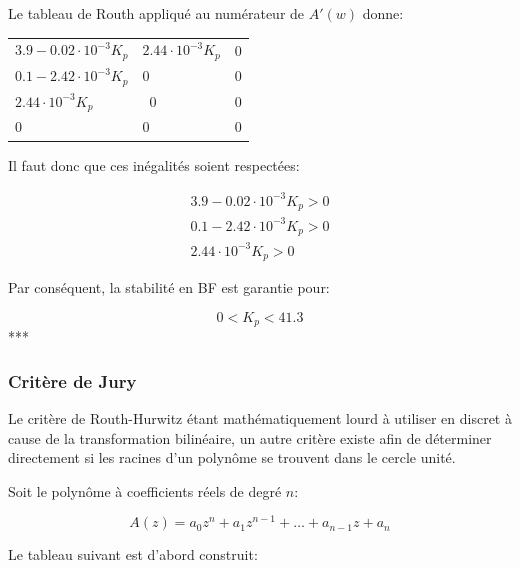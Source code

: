 \documentclass[11pt]{article}
\begin{document}
    Le tableau de Routh appliqué au numérateur de \(A'(w)\) donne:

\begin{longtable}[]{@{}lll@{}}
\toprule
\( 3.9-0.02\cdot 10^{-3}K_p \) & \( 2.44\cdot 10^{-3}K_p \) &
\( 0 \)\tabularnewline
\( 0.1-2.42\cdot 10^{-3}K_p \) & \( 0 \) & \( 0 \)\tabularnewline
\( 2.44\cdot 10^{-3}K_p \) & ~\( 0 \) & \( 0 \)\tabularnewline
\( 0 \) & \( 0 \) & \( 0 \)\tabularnewline
\bottomrule
\end{longtable}

    Il faut donc que ces inégalités soient respectées:

\begin{align}
  3.9-0.02\cdot 10^{-3}K_p > 0 \\
  0.1-2.42\cdot 10^{-3}K_p > 0 \\
  2.44\cdot 10^{-3}K_p > 0
\end{align}

    Par conséquent, la stabilité en BF est garantie pour:

\[ 0 < K_p < 41.3 \] ***

    \subsubsection{Critère de Jury}\label{crituxe8re-de-jury}

    Le critère de Routh-Hurwitz étant mathématiquement lourd à utiliser en
discret à cause de la transformation bilinéaire, un autre critère existe
afin de déterminer directement si les racines d'un polynôme se trouvent
dans le cercle unité.

    Soit le polynôme à coefficients réels de degré \(n\):

\[ A(z) = a_0 z^n + a_1 z^{n-1} + \dots + a_{n-1} z + a_n \]

    Le tableau suivant est d'abord construit:
\end{document}
